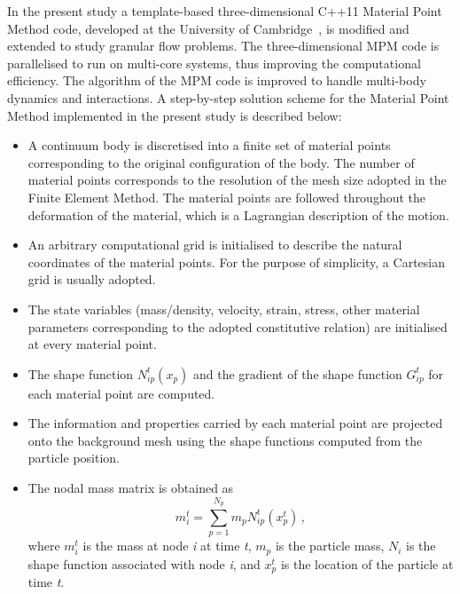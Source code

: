 In the present study a template-based three-dimensional C++11 Material Point 
Method code, developed at the University of Cambridge~\citep{Bandara2013}, is 
modified and extended to study granular flow problems. The three-dimensional 
MPM code is parallelised to run on multi-core systems, thus improving the 
computational efficiency. The algorithm of the MPM code is improved to handle 
multi-body dynamics and interactions. A step-by-step solution scheme for 
the Material Point Method implemented in the present study is described below:

\begin{itemize}

\item
A continuum body is discretised into a finite set of material points 
corresponding to the original configuration of the body. The number of material 
points corresponds to the resolution of the mesh size adopted in the Finite 
Element Method. The material points are followed throughout the deformation of 
the material, which is a Lagrangian description of the motion. 

\item
An arbitrary computational grid is initialised to describe the natural 
coordinates of the material points. For the purpose of simplicity, a Cartesian 
grid is usually adopted. 

\item
The state variables (mass/density, velocity, strain, stress, other material 
parameters corresponding to the adopted constitutive relation) are initialised 
at every material point. 

\item
The shape function $N_{ip}^t(x_p)$ and the gradient of the shape function 
$G_{ip}^t$ for each material point are computed.

\item
The information and properties carried by each material point are projected 
onto the background mesh using the shape functions computed from the 
particle position. 

\item
The nodal mass matrix is obtained as
%
\begin{equation}
\mathit{m}_{\mathit{i}}^{\mathit{t}} = 
\sum\limits_{\mathit{p}=1}^{\mathit{N}_{\mathit{p}}} \mathit{m}_{\mathit{p}} 
\mathit{N}_{\mathit{ip}}^{\mathit{t}}(x^t_p) \,,
\end{equation}
%
where $\mathit{m}_{i}^{t}$ is the mass at node \textit{i} at time \textit{t}, 
$\mathit{m}_{\mathit{p}}$ is the particle mass, $\mathit{N}_{\mathit{i}}$ is 
the shape function associated with node \textit{i}, and 
$\mathit{x}_{\mathit{p}}^{\mathit{t}}$ is the location of the particle at time
\textit{t}.


\end{itemize}
